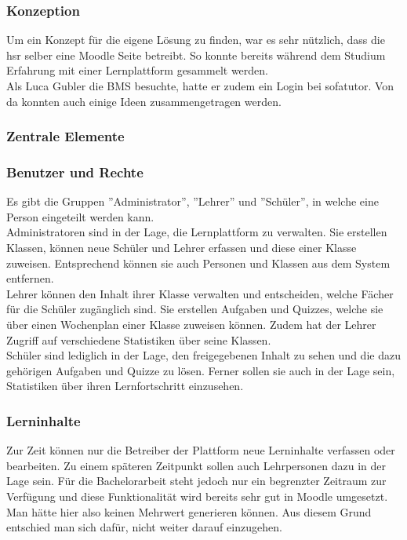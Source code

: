 \subsubsection{Konzeption}
Um ein Konzept für die eigene Lösung zu finden, war es sehr nützlich, dass die \gls{hsr} selber eine Moodle Seite betreibt. So konnte bereits während dem Studium Erfahrung mit einer Lernplattform gesammelt werden. \\

\noindent Als Luca Gubler die BMS besuchte, hatte er zudem ein Login bei sofatutor. Von da konnten auch einige Ideen zusammengetragen werden. 


\subsubsection{Zentrale Elemente}
\subsubsection*{Benutzer und Rechte}
Es gibt die Gruppen ''Administrator'', ''Lehrer'' und ''Schüler'', in welche eine Person eingeteilt werden kann. \\

\noindent Administratoren sind in der Lage, die Lernplattform zu verwalten. Sie erstellen Klassen, können neue Schüler und Lehrer erfassen und diese einer Klasse zuweisen. Entsprechend können sie auch Personen und Klassen aus dem System entfernen. \\

\noindent Lehrer können den Inhalt ihrer Klasse verwalten und entscheiden, welche Fächer für die Schüler zugänglich sind. Sie erstellen Aufgaben und Quizzes, welche sie über einen Wochenplan einer Klasse zuweisen können. Zudem hat der Lehrer Zugriff auf verschiedene Statistiken über seine Klassen. \\

\noindent Schüler sind lediglich in der Lage, den freigegebenen Inhalt zu sehen und die dazu gehörigen Aufgaben und Quizze zu lösen. Ferner sollen sie auch in der Lage sein, Statistiken über ihren Lernfortschritt einzusehen.

\subsubsection*{Lerninhalte}
Zur Zeit können nur die Betreiber der Plattform neue Lerninhalte verfassen oder bearbeiten. Zu einem späteren Zeitpunkt sollen auch Lehrpersonen dazu in der Lage sein. Für die Bachelorarbeit steht jedoch nur ein begrenzter Zeitraum zur Verfügung und diese Funktionalität wird bereits sehr gut in Moodle umgesetzt. Man hätte hier also keinen Mehrwert generieren können. Aus diesem Grund entschied man sich dafür, nicht weiter darauf einzugehen. 

